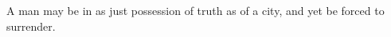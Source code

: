 \documentclass[MAIN]{subfiles}
\begin{document}
A man may be in as just possession of truth as of a city, and yet be forced to surrender.
\end{document}
